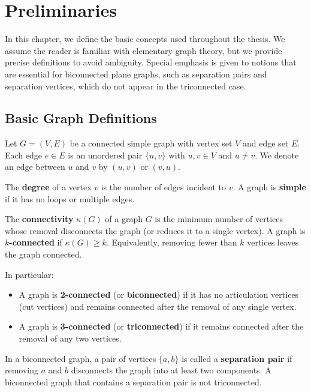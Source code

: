 
\chapter{Preliminaries}
\label{ch:preliminaries}

In this chapter, we define the basic concepts used throughout the thesis. 
We assume the reader is familiar with elementary graph theory, but we provide precise definitions to avoid ambiguity. 
Special emphasis is given to notions that are essential for biconnected plane graphs, such as separation pairs and separation vertices, which do not appear in the triconnected case.

\section{Basic Graph Definitions}
\label{sec:basic_graph_defs}

Let \(G = (V, E)\) be a connected simple graph with vertex set \(V\) and edge set \(E\). 
Each edge \(e \in E\) is an unordered pair \(\{u, v\}\) with \(u, v \in V\) and \(u \neq v\). 
We denote an edge between \(u\) and \(v\) by \((u, v)\) or \((v, u)\).

The \textbf{degree} of a vertex \(v\) is the number of edges incident to \(v\). 
A graph is \textbf{simple} if it has no loops or multiple edges.

The \textbf{connectivity} \(\kappa(G)\) of a graph \(G\) is the minimum number of vertices whose removal disconnects the graph (or reduces it to a single vertex). 
A graph is \textbf{\(k\)-connected} if \(\kappa(G) \ge k\). 
Equivalently, removing fewer than \(k\) vertices leaves the graph connected.

In particular:
\begin{itemize}
    \item A graph is \textbf{2-connected} (or \textbf{biconnected}) if it has no articulation vertices (cut vertices) and remains connected after the removal of any single vertex.
    \item A graph is \textbf{3-connected} (or \textbf{triconnected}) if it remains connected after the removal of any two vertices.
\end{itemize}

\begin{definition}
    \label{def:separation_pair}
    In a biconnected graph, a pair of vertices \(\{a, b\}\) is called a \textbf{separation pair} if removing \(a\) and \(b\) disconnects the graph into at least two components. 
    A biconnected graph that contains a separation pair is not triconnected.
\end{definition}


